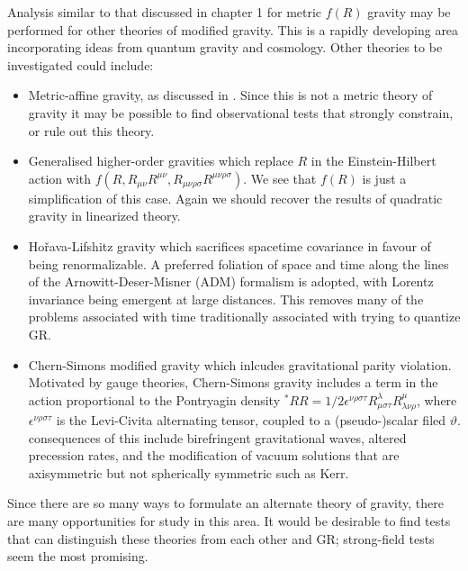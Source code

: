 Analysis similar to that discussed in chapter 1 for metric $f(R)$ gravity may be performed for other theories of modified gravity. This is a rapidly developing area incorporating ideas from quantum gravity and cosmology. Other theories to be investigated could include:
\begin{itemize}
\item Metric-affine gravity\cite{Sotiriou2007, Sotiriou2007b}, as discussed in . Since this is not a metric theory of gravity it may be possible to find observational tests that strongly constrain, or rule out this theory\cite{Will2006}.
\item{} Generalised higher-order gravities which replace $R$ in the Einstein-Hilbert action with $f(R, R_{\mu\nu}R^{\mu\nu}, R_{\mu\nu\rho\sigma}R^{\mu\nu\rho\sigma})$\cite{Farhoudi2006, Madsen1989}. We see that $f(R)$ is just a simplification of this case. Again we should recover the results of quadratic gravity in linearized theory\cite{Pechlaner1966, Stelle1978, Schmidt1986, Teyssandier1990, Capozziello2009b}.
\item{} Ho\v{r}ava-Lifshitz gravity\cite{Horava2009, Blas2010a, Sotiriou2009c} which sacrifices spacetime covariance in favour of being renormalizable. A preferred foliation of space and time along the lines of the Arnowitt-Deser-Misner (ADM) formalism is adopted\cite{Arnowitt1962a}, with Lorentz invariance being emergent at large distances. This removes many of the problems associated with time traditionally associated with trying to quantize GR.
\item{} Chern-Simons modified gravity\cite{Alexander2009a} which inlcudes gravitational parity violation. Motivated by gauge theories, Chern-Simons gravity includes a term in the action proportional to the Pontryagin density $^\ast R R = 1/2 \epsilon^{\nu\rho\sigma\tau}R^\lambda_{\mu\sigma\tau}R^\mu_{\lambda\nu\rho}$, where $\epsilon^{\nu\rho\sigma\tau}$ is the Levi-Civita alternating tensor, coupled to a (pseudo-)scalar filed $\vartheta$. consequences of this include birefringent gravitational waves, altered precession rates, and the modification of vacuum solutions that are axisymmetric but not spherically symmetric such as Kerr.
\end{itemize}
Since there are so many ways to formulate an alternate theory of gravity, there are many opportunities for study in this area. It would be desirable to find tests that can distinguish these theories from each other and GR; strong-field tests seem the most promising.

